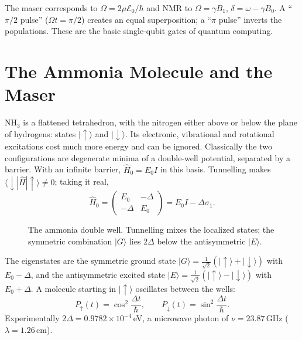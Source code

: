 The maser corresponds to $\Omega = 2\mu\mathcal{E}_0/\hbar$ and NMR to $\Omega = \gamma B_1$, $\delta = \omega-\gamma B_0$. A ``$\pi/2$ pulse'' ($\Omega t = \pi/2$) creates an equal superposition; a ``$\pi$ pulse'' inverts the populations. These are the basic single-qubit gates of quantum computing.

\section{The Ammonia Molecule and the Maser}

NH$_3$ is a flattened tetrahedron, with the nitrogen either above or below the plane of hydrogens: states $|{\uparrow}\rangle$ and $|{\downarrow}\rangle$. Its electronic, vibrational and rotational excitations cost much more energy and can be ignored. Classically the two configurations are degenerate minima of a double-well potential, separated by a barrier. With an infinite barrier, $\hat{H}_0 = E_0I$ in this basis. Tunnelling makes $\langle{\downarrow}|\hat{H}|{\uparrow}\rangle\neq0$; taking it real,
\[
    \hat{H}_0 = \begin{pmatrix}E_0 & -\Delta\\ -\Delta & E_0\end{pmatrix} = E_0I - \Delta\sigma_1 .
\]
\begin{figure}[ht]
\centering
{}
\caption{The ammonia double well. Tunnelling mixes the localized states; the symmetric combination $|G\rangle$ lies $2\Delta$ below the antisymmetric $|E\rangle$.}
\end{figure}

The eigenstates are the symmetric ground state $|G\rangle = \frac{1}{\sqrt2}(|{\uparrow}\rangle + |{\downarrow}\rangle)$ with $E_0-\Delta$, and the antisymmetric excited state $|E\rangle = \frac{1}{\sqrt2}(|{\uparrow}\rangle - |{\downarrow}\rangle)$ with $E_0+\Delta$. A molecule starting in $|{\uparrow}\rangle$ oscillates between the wells:
\[
    P_\uparrow(t) = \cos^2\frac{\Delta t}{\hbar},
    \qquad
    P_\downarrow(t) = \sin^2\frac{\Delta t}{\hbar}.
\]
Experimentally $2\Delta = 0.9782\times10^{-4}$\,eV, a microwave photon of $\nu = 23.87$\,GHz ($\lambda = 1.26$\,cm).

